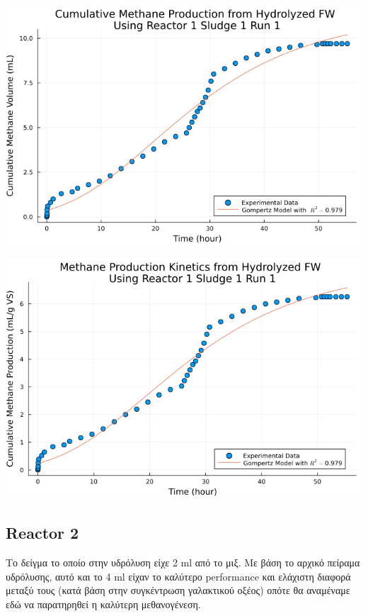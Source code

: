 \documentclass[11pt]{article}
\begin{document}
\begin{center}
\includegraphics[width=.9\linewidth]{../plots/BMPs/Hydrolyzed FW/methane_kinetics_hydrolysate_1_s1_r1_hour.png}
\end{center}

\begin{center}
\includegraphics[width=.9\linewidth]{../plots/BMPs/Hydrolyzed FW/specific_methane_kinetics_hydrolysate_1_s1_r1_hour.png}
\end{center}

\subsection{Reactor 2}
\label{sec:orga0a2e98}
Το δείγμα το οποίο στην υδρόλυση είχε 2 ml από το μιξ. Με βάση το αρχικό πείραμα υδρόλυσης, αυτό και το 4 ml είχαν το καλύτερο performance και ελάχιστη διαφορά μεταξύ τους (κατά βάση στην συγκέντρωση γαλακτικού οξέος) οπότε θα αναμέναμε εδώ να παρατηρηθεί η καλύτερη μεθανογένεση.
\end{document}
